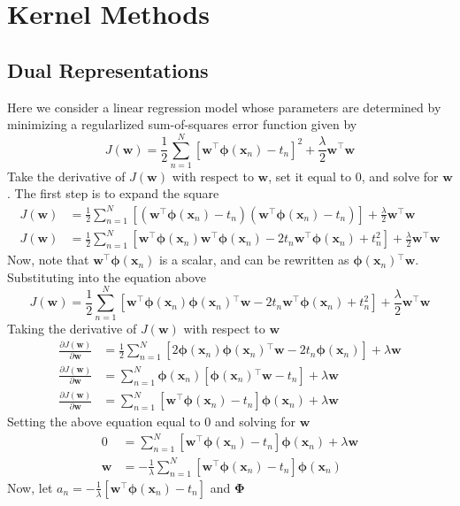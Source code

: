 \documentclass[12pt]{article}
\newcommand{\w}{\mathbf{w}}
\newcommand{\sumN}{\sum \limits_{n=1}^N}
\newcommand{\Jw}{J\left(\w{}\right)}
\newcommand{\wTransW}{\w{}^\top\w{}}
\newcommand{\dJdW}{\frac{\partial \Jw{}}{\partial \w{}}}
\newcommand{\phiXn}{\mathbf{\phi}\left(\mathbf{x}_n\right)}
\newcommand{\wTransPhi}{\w{}^\top\phiXn{}}
\newcommand{\phiTransW}{\phiXn{}^\top\w{}}
\newcommand{\PhiMat}{\mathbf{\Phi}}
\begin{document}
\section{Kernel Methods}
\subsection{Dual Representations}
Here we consider a linear regression model whose parameters are determined by
minimizing a regularlized sum-of-squares error function given by
%
\begin{equation*}
  \Jw{} = \frac{1}{2}\sumN{}\left[\wTransPhi{} - t_n\right]^2 +
  \frac{\lambda}{2}\wTransW{}
\end{equation*}
%
Take the derivative of $\Jw{}$ with respect to $\w{}$, set it equal to $0$, and
solve for $\w{}$. The first step is to expand the square
%
\begin{align*}
  \Jw{} &= \frac{1}{2}\sumN{}
  \left[\left(\wTransPhi{} - t_n\right)\left(\wTransPhi{} - t_n\right)\right] +
  \frac{\lambda}{2}\wTransW{} \\
  \Jw{} &= \frac{1}{2}\sumN{}
  \left[\wTransPhi{}\wTransPhi{} - 2t_n\wTransPhi{} + t_n^2\right] +
  \frac{\lambda}{2}\wTransW{}
\end{align*}
%
Now, note that $\wTransPhi{}$ is a scalar, and can be rewritten as
$\phiTransW{}$. Substituting into the equation above
%
\begin{equation*}
  \Jw{} = \frac{1}{2}\sumN{}
  \left[\wTransPhi{}\phiTransW{} - 2t_n\wTransPhi{} + t_n^2\right] +
  \frac{\lambda}{2}\wTransW{}
\end{equation*}
%
Taking the derivative of $\Jw{}$ with respect to $\w{}$
%
\begin{align*}
  \dJdW{} &= \frac{1}{2}\sumN{}
  \left[2\phiXn{}\phiXn{}^\top\w{} - 2t_n\phiXn{}\right] + \lambda\w{} \\
  \dJdW{} &= \sumN{}\phiXn{}\left[\phiTransW{} - t_n\right] + \lambda\w{} \\
  \dJdW{} &= \sumN{}\left[\wTransPhi{} - t_n\right]\phiXn{} + \lambda\w{}
\end{align*}
%
Setting the above equation equal to $0$ and solving for $\w{}$
\begin{align*}
  0 &= \sumN{}\left[\wTransPhi{} - t_n\right]\phiXn{} + \lambda\w{} \\
  \w{} &= -\frac{1}{\lambda}\sumN{}\left[\wTransPhi{} - t_n\right]\phiXn{}
\end{align*}
%
Now, let $a_n = -\frac{1}{\lambda}\left[\wTransPhi{} - t_n\right]$ and
$\PhiMat{}$
\end{document}
